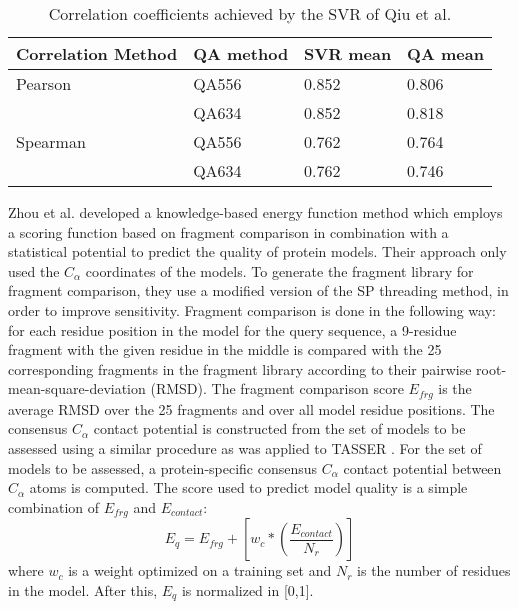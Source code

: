 \begin{table}[tb]
\center
\begin{tabular}{llll}
\toprule                %
\textbf{Correlation Method} & \textbf{QA method} & \textbf{SVR mean} & \textbf{QA mean} \\
\midrule                %
	Pearson		&QA556	&0.852	&0.806\\
			&QA634	&0.852	&0.818\\
	Spearman	&QA556	&0.762	&0.764\\
			&QA634	&0.762	&0.746\\
\bottomrule                %
\end{tabular}
\caption[Correlation coefficients achieved by the SVR of Qiu et al]{Correlation coefficients achieved by the SVR of Qiu et al.}
\label{tab:svr_corr}
\end{table}
Zhou et al.\cite{Zhou2008} developed a knowledge-based energy function method which employs a scoring function based on fragment comparison in combination with a statistical potential to predict the quality of protein models. Their approach only used the $C_\alpha$ coordinates of the models. To generate the fragment library for fragment comparison, they use a modified version of the SP \cite{Moult2007} threading method, in order to improve sensitivity. Fragment comparison is done in the following way: for each residue position in the model for the query sequence, a 9-residue fragment with the given residue in the middle is compared with the 25 corresponding fragments in the fragment library according to their pairwise root-mean-square-deviation (RMSD). The fragment comparison score $E_{frg}$ is the average RMSD over the 25 fragments and over all model residue positions. The consensus $C_\alpha$ contact potential is constructed from the set of models to be assessed using a similar procedure as was applied to TASSER \cite{Zhang2005aa, Zhang2004a, Zhang2004}. For the set of models to be assessed, a protein-specific consensus $C_\alpha$ contact potential between $C_\alpha$ atoms is computed. The score used to predict model quality is a simple combination of $E_{frg}$ and $E_{contact}$:
\begin{equation}
E_q = E_{frg} + [w_c * (\frac{E_{contact}}{N_r})]
\end{equation}
where $w_c$ is a weight optimized on a training set and $N_r$ is the number of residues in the model. After this, $E_q$ is normalized in [0,1].


